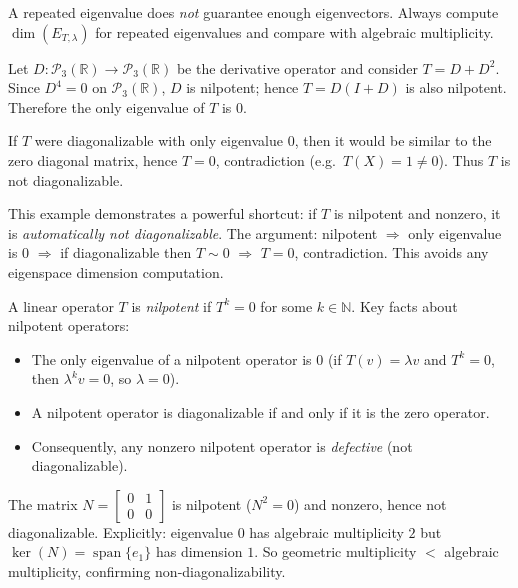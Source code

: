 \begin{commonmistake}[title={Common Mistake: "repeated eigenvalue $\Rightarrow$ diagonalizable" (false)}]
A repeated eigenvalue does \emph{not} guarantee enough eigenvectors.
Always compute $\dim(E_{T,\lambda})$ for repeated eigenvalues and compare with algebraic multiplicity.
\end{commonmistake}

\begin{examplebox}[title={Worked Example (Lecture Week 9): $D+D^2$ on $\mathcal{P}_3(\mathbb{R})$ is not diagonalizable}]
Let $D:\mathcal{P}_3(\mathbb{R})\to\mathcal{P}_3(\mathbb{R})$ be the derivative operator and consider $T=D+D^2$.
Since $D^4=0$ on $\mathcal{P}_3(\mathbb{R})$, $D$ is nilpotent; hence $T=D(I+D)$ is also nilpotent.
Therefore the only eigenvalue of $T$ is $0$.

If $T$ were diagonalizable with only eigenvalue $0$, then it would be similar to the zero diagonal matrix, hence $T=0$, contradiction (e.g.\ $T(X)=1\neq 0$).
Thus $T$ is not diagonalizable.
\end{examplebox}

This example demonstrates a powerful shortcut: if $T$ is nilpotent and nonzero, it is \emph{automatically not diagonalizable}.
The argument: nilpotent $\Rightarrow$ only eigenvalue is $0$ $\Rightarrow$ if diagonalizable then $T\sim 0$ $\Rightarrow$ $T=0$, contradiction.
This avoids any eigenspace dimension computation.

\begin{examtip}[title={Exam Focus: nilpotent operators and diagonalizability}]
A linear operator $T$ is \emph{nilpotent} if $T^k=0$ for some $k\in\mathbb{N}$.
Key facts about nilpotent operators:
\begin{itemize}
\item The only eigenvalue of a nilpotent operator is $0$ (if $T(v)=\lambda v$ and $T^k=0$, then $\lambda^k v = 0$, so $\lambda=0$).
\item A nilpotent operator is diagonalizable if and only if it is the zero operator.
\item Consequently, any nonzero nilpotent operator is \emph{defective} (not diagonalizable).
\end{itemize}
\end{examtip}

\begin{examplebox}[title={Worked micro-example: the simplest non-diagonalizable matrix}]
The matrix $N=\begin{bmatrix}0&1\\0&0\end{bmatrix}$ is nilpotent ($N^2=0$) and nonzero, hence not diagonalizable.
Explicitly: eigenvalue $0$ has algebraic multiplicity $2$ but $\ker(N)=\operatorname{span}\{e_1\}$ has dimension $1$.
So geometric multiplicity $<$ algebraic multiplicity, confirming non-diagonalizability.
\end{examplebox}


